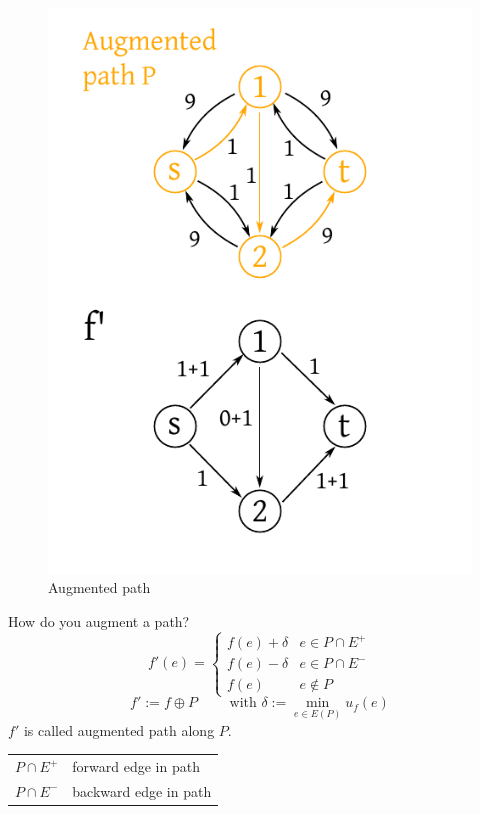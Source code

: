 \documentclass{article}
\begin{document}
\begin{figure}[ht]
 \begin{center}
  \includegraphics{img/augmented_path.pdf}
  \caption{Augmented path}
 \end{center}
\end{figure}

How do you augment a path?
\[
  f'(e) = \left\{\begin{array}{lc}
    f(e) + \delta  & e \in P \cap E^+ \\
    f(e) - \delta  & e \in P \cap E^- \\
    f(e)           & e \notin P
  \end{array}\right.
\] \[
  f' := f \oplus P \qquad \text{ with } \delta := \min_{e \in E(P)} {u_f(e)}
\]
$f'$ is called augmented path along $P$.

\begin{center}
 \begin{tabular}{cl}
  $P \cap E^+$ & forward edge in path \\
  $P \cap E^-$ & backward edge in path
 \end{tabular}
\end{center}
\end{document}
